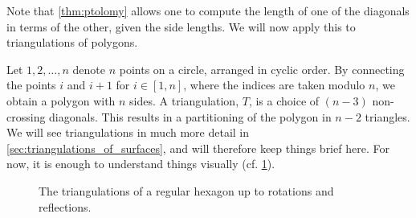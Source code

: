 \begin{example}\label{exmp:triangulations}

	Note that \cref{thm:ptolomy} allows one to compute the length of one of the diagonals
	in terms of the other, given the side lengths. We will now apply this to triangulations
	of polygons.

	Let $1, 2, \dots, n$ denote $n$ points on a circle, arranged in cyclic order. By
	connecting the points $i$ and $i +1$ for $i \in [1, n]$, where the indices are taken
	modulo $n$, we obtain a polygon with $n$ sides. A triangulation, $T$, is a choice of $(n-3)$ non-crossing diagonals. This results in a
	partitioning of the polygon in $n-2$ triangles. We will see triangulations in much more
	detail in \cref{sec:triangulations_of_surfaces}, and will therefore keep things brief
	here. For now, it is enough to understand things visually (cf.
	\cref{fig:hexagon_triangulations}).
	\begin{figure}[ht]
		\centering

		\caption{The triangulations of a regular hexagon up to rotations and reflections.}
		\label{fig:hexagon_triangulations}
	\end{figure}


\end{example}
